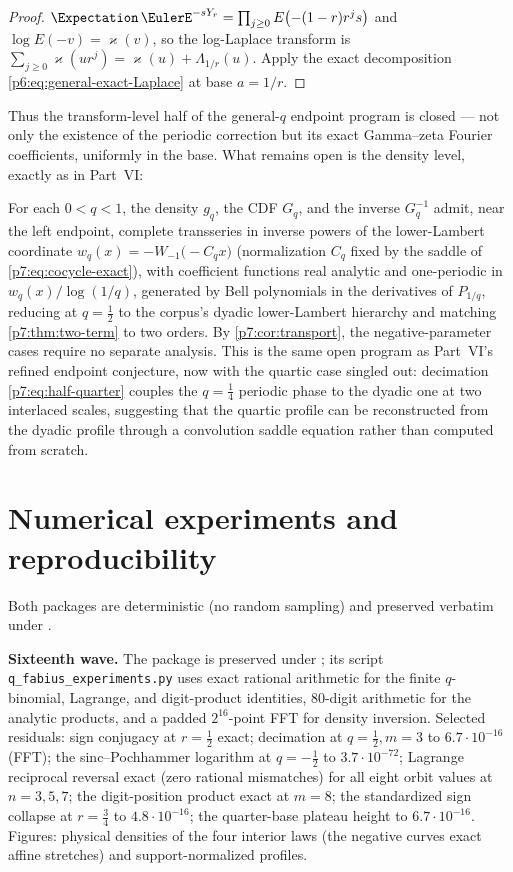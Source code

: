 \documentclass[11pt,oneside]{article}
\numberwithin{equation}{section}
\theoremstyle{definition}
\theoremstyle{remark}
\begin{document}
\begin{proof}
$\Expectation\,\EulerE^{-sY_r}=\prod_{j\ge0}E\bigl(-(1-r)r^js\bigr)$ and
$\log E(-v)=\varkappa(v)$, so the log-Laplace transform is
$\sum_{j\ge0}\varkappa(ur^{j})=\varkappa(u)+\Lambda_{1/r}(u)$.  Apply the
exact decomposition \eqref{p6:eq:general-exact-Laplace} at base $a=1/r$.
\end{proof}

Thus the transform-level half of the general-$q$ endpoint program is closed
--- not only the existence of the periodic correction but its exact
Gamma--zeta Fourier coefficients, uniformly in the base.  What remains open
is the density level, exactly as in Part~VI:

\begin{conjecture}
\label{p7:conj:all-orders}
For each $0<q<1$, the density $g_q$, the CDF $G_q$, and the inverse
$G_q^{-1}$ admit, near the left endpoint, complete transseries in inverse
powers of the lower-Lambert coordinate
$w_q(x)=-W_{-1}\bigl(-C_qx\bigr)$ (normalization $C_q$ fixed by the saddle
of \eqref{p7:eq:cocycle-exact}), with coefficient functions real analytic and
one-periodic in $w_q(x)/\log(1/q)$, generated by Bell polynomials in the
derivatives of $P_{1/q}$, reducing at $q=\tfrac12$ to the corpus's dyadic
lower-Lambert hierarchy and matching \cref{p7:thm:two-term} to two orders.
By \cref{p7:cor:transport}, the negative-parameter cases require no separate
analysis.  This is the same open program as Part~VI's refined endpoint
conjecture, now with the quartic case singled out: decimation
\eqref{p7:eq:half-quarter} couples the $q=\tfrac14$ periodic phase to the
dyadic one at two interlaced scales, suggesting that the quartic profile can
be reconstructed from the dyadic profile through a convolution saddle
equation rather than computed from scratch.
\end{conjecture}
\section{Numerical experiments and reproducibility}
\label{p7:sec:numerics}

Both packages are deterministic (no random sampling) and preserved verbatim
under .

\textbf{Sixteenth wave.}  The package is preserved under
; its script
\texttt{q\_fabius\_experiments.py} uses exact rational arithmetic for the
finite $q$-binomial, Lagrange, and digit-product identities, 80-digit
arithmetic for the analytic products, and a padded $2^{16}$-point FFT for
density inversion.
Selected residuals: sign conjugacy at $r=\tfrac12$ exact; decimation at
$q=\tfrac12,m=3$ to $6.7\cdot10^{-16}$ (FFT); the sinc--Pochhammer logarithm
at $q=-\tfrac12$ to $3.7\cdot10^{-72}$; Lagrange reciprocal reversal exact
(zero rational mismatches) for all eight orbit values at $n=3,5,7$; the
digit-position product exact at $m=8$; the standardized sign collapse at
$r=\tfrac34$ to $4.8\cdot10^{-16}$; the quarter-base plateau height to
$6.7\cdot10^{-16}$.  Figures: physical densities of the four interior laws
(the negative curves exact affine stretches) and support-normalized profiles.
\end{document}
